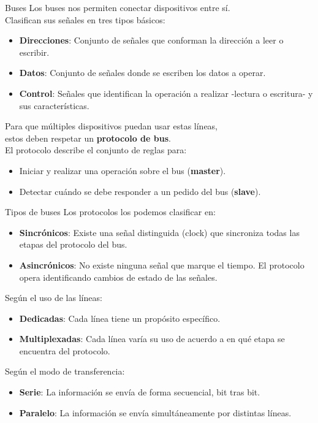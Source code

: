 \documentclass[aspectratio=169]{beamer}
\begin{document}
\begin{frame}[fragile]{Buses}
    Los buses nos permiten conectar dispositivos entre sí.\\
    \bigskip
    Clasifican sus señales en tres tipos básicos:
    \begin{itemize}
    \item \textbf{Direcciones}: Conjunto de señales que conforman la dirección a leer o escribir.
    \item \textbf{Datos}: Conjunto de señales donde se escriben los datos a operar.
    \item \textbf{Control}: Señales que identifican la operación a realizar -lectura o escritura- y sus características.
    \end{itemize}
    \pause
    Para que múltiples dispositivos puedan usar estas líneas,\\ estos deben respetar un \textbf{protocolo de bus}.\\
    \bigskip
    El protocolo describe el conjunto de reglas para:
    \begin{itemize}
    \item Iniciar y realizar una operación sobre el bus (\textbf{master}).
    \item Detectar cuándo se debe responder a un pedido del bus (\textbf{slave}).
    \end{itemize}
\end{frame}

\begin{frame}[fragile]{Tipos de buses}
    Los \textcolor{naranjauca}{protocolos} los podemos clasificar en:
    \begin{itemize}
    \item \textbf{Sincrónicos}: Existe una señal distinguida (clock) que sincroniza todas las etapas del protocolo del bus.
    \item \textbf{Asincrónicos}: No existe ninguna señal que marque el tiempo. El protocolo opera identificando cambios de estado de las señales.
    \end{itemize}
    \bigskip
    \pause
    Según el uso de las líneas:\\
    \begin{itemize}
    \item \textbf{Dedicadas}: Cada línea tiene un propósito específico.
    \item \textbf{Multiplexadas}: Cada línea varía su uso de acuerdo a en qué etapa se encuentra del protocolo.
    \end{itemize}
    \bigskip
    \pause
    Según el modo de transferencia:\\
    \begin{itemize}
    \item \textbf{Serie}: La información se envía de forma secuencial, bit tras bit.
    \item \textbf{Paralelo}: La información se envía simultáneamente por distintas líneas.
    \end{itemize}
\end{frame}
\end{document}
